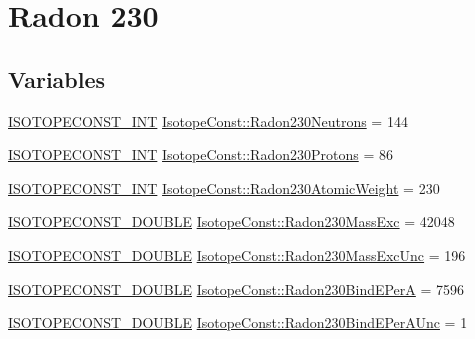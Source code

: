 \hypertarget{group___isotope_const-_radon-_rn230}{}\section{Radon 230}
\label{group___isotope_const-_radon-_rn230}
\subsection*{Variables}
\begin{DoxyCompactItemize}
\item 
\mbox{\hyperlink{group___isotope_const-_macros_ga5f18360b3e99483a35c32d789e62621c}{I\+S\+O\+T\+O\+P\+E\+C\+O\+N\+S\+T\+\_\+\+I\+NT}} \mbox{\hyperlink{group___isotope_const-_radon-_rn230_gadb39650767de41460a7be4d26518deb3}{Isotope\+Const\+::\+Radon230\+Neutrons}} = 144
\item 
\mbox{\hyperlink{group___isotope_const-_macros_ga5f18360b3e99483a35c32d789e62621c}{I\+S\+O\+T\+O\+P\+E\+C\+O\+N\+S\+T\+\_\+\+I\+NT}} \mbox{\hyperlink{group___isotope_const-_radon-_rn230_ga483fffcf3c26c46637fa826e6796b7d2}{Isotope\+Const\+::\+Radon230\+Protons}} = 86
\item 
\mbox{\hyperlink{group___isotope_const-_macros_ga5f18360b3e99483a35c32d789e62621c}{I\+S\+O\+T\+O\+P\+E\+C\+O\+N\+S\+T\+\_\+\+I\+NT}} \mbox{\hyperlink{group___isotope_const-_radon-_rn230_ga3063f710b53b64bf92f170e222aa3da7}{Isotope\+Const\+::\+Radon230\+Atomic\+Weight}} = 230
\item 
\mbox{\hyperlink{group___isotope_const-_macros_ga8f45a7272ce02c0b4c65c44636ed719a}{I\+S\+O\+T\+O\+P\+E\+C\+O\+N\+S\+T\+\_\+\+D\+O\+U\+B\+LE}} \mbox{\hyperlink{group___isotope_const-_radon-_rn230_ga723218f9f0b3d69e4cda1f313a99643c}{Isotope\+Const\+::\+Radon230\+Mass\+Exc}} = 42048
\item 
\mbox{\hyperlink{group___isotope_const-_macros_ga8f45a7272ce02c0b4c65c44636ed719a}{I\+S\+O\+T\+O\+P\+E\+C\+O\+N\+S\+T\+\_\+\+D\+O\+U\+B\+LE}} \mbox{\hyperlink{group___isotope_const-_radon-_rn230_gaffed2a1abc46092934223455cf65e6a4}{Isotope\+Const\+::\+Radon230\+Mass\+Exc\+Unc}} = 196
\item 
\mbox{\hyperlink{group___isotope_const-_macros_ga8f45a7272ce02c0b4c65c44636ed719a}{I\+S\+O\+T\+O\+P\+E\+C\+O\+N\+S\+T\+\_\+\+D\+O\+U\+B\+LE}} \mbox{\hyperlink{group___isotope_const-_radon-_rn230_ga9fb0f0b8ef3264e616486edb061b4929}{Isotope\+Const\+::\+Radon230\+Bind\+E\+PerA}} = 7596
\item 
\mbox{\hyperlink{group___isotope_const-_macros_ga8f45a7272ce02c0b4c65c44636ed719a}{I\+S\+O\+T\+O\+P\+E\+C\+O\+N\+S\+T\+\_\+\+D\+O\+U\+B\+LE}} \mbox{\hyperlink{group___isotope_const-_radon-_rn230_ga02dc42d3648c5f74480948531576e628}{Isotope\+Const\+::\+Radon230\+Bind\+E\+Per\+A\+Unc}} = 1

\end{DoxyCompactItemize}
